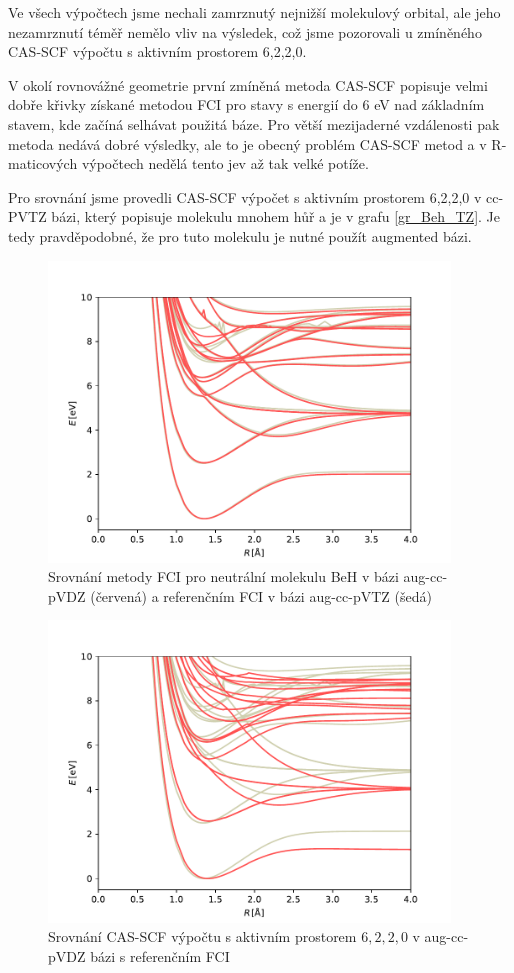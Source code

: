 Ve všech výpočtech jsme 
nechali zamrznutý nejnižší molekulový orbital, ale jeho nezamrznutí téměř nemělo vliv 
na výsledek, což jsme pozorovali u zmíněného CAS-SCF výpočtu s aktivním prostorem 6,2,2,0.

V okolí rovnovážné geometrie první zmíněná metoda CAS-SCF popisuje velmi dobře křivky 
získané metodou FCI pro stavy s energií do 6 eV nad základním stavem, kde začíná 
selhávat použitá báze. Pro větší mezijaderné vzdálenosti pak metoda nedává dobré 
výsledky, ale to je obecný problém CAS-SCF metod a v R-maticových výpočtech nedělá 
tento jev až tak velké potíže.

Pro srovnání jsme provedli CAS-SCF výpočet s aktivním prostorem 6,2,2,0 v cc-PVTZ bázi, 
který popisuje molekulu mnohem hůř a je v grafu \ref{gr_Beh_TZ}. Je tedy 
pravděpodobné, že pro tuto molekulu je nutné použít augmented bázi.
\begin{figure}
\centering
\includegraphics[width=0.95\textwidth]{../img/BeH-FCI-DZ.pdf}
\caption{Srovnání metody FCI pro neutrální molekulu BeH v bázi aug-cc-pVDZ (červená) a referenčním FCI v bázi aug-cc-pVTZ (šedá)}
\label{gr_Beh_FCI}
\end{figure}

\begin{figure}
\centering
\includegraphics[width=0.95\textwidth]{../img/BeH-MULTI-DZ-6220.pdf}
\caption{Srovnání CAS-SCF výpočtu s aktivním prostorem $6,2,2,0$ v aug-cc-pVDZ bázi s referenčním FCI}
\label{gr_Beh_6220}
\end{figure}

